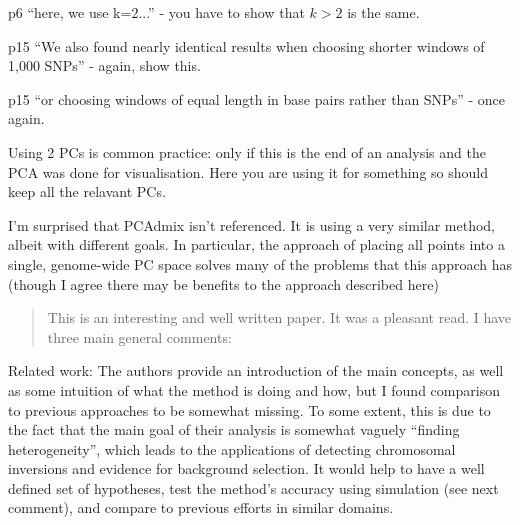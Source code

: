 \begin{point}{p6}
``here, we use k=2...''  - you have to show that $k>2$ is the same.
\end{point}

\begin{point}{p15}
``We also found nearly identical results when choosing shorter windows of 1,000 SNPs'' - again, show this.
\end{point}

\begin{point}{p15}
 ``or choosing windows of equal length in base pairs rather than SNPs'' - once again.
\end{point}

\begin{point}{}
Using 2 PCs is common practice: only if this is the end of an analysis and the
PCA was done for visualisation. Here you are using it for something so should
keep all the relavant PCs.
\end{point}

\begin{point}{}
I'm surprised that PCAdmix isn't referenced. It is using a very similar
method, albeit with different goals. In particular, the approach of placing all
points into a single, genome-wide PC space solves many of the problems that this
approach has (though I agree there may be benefits to the approach described here)
\end{point}



\begin{quote}
    This is an interesting and well written paper. It was a pleasant read. I have three main general
    comments:
\end{quote}


\begin{point}{Related work:} 
The authors provide an introduction of the main concepts, as well as some
intuition of what the method is doing and how, but I found comparison to previous approaches
to be somewhat missing. To some extent, this is due to the fact that the main goal of their
analysis is somewhat vaguely ``finding heterogeneity'', which leads to the applications of
detecting chromosomal inversions and evidence for background selection. It would help to
have a well defined set of hypotheses, test the method’s accuracy  using simulation (see next
comment), and compare to previous efforts in similar domains.
\end{point}

